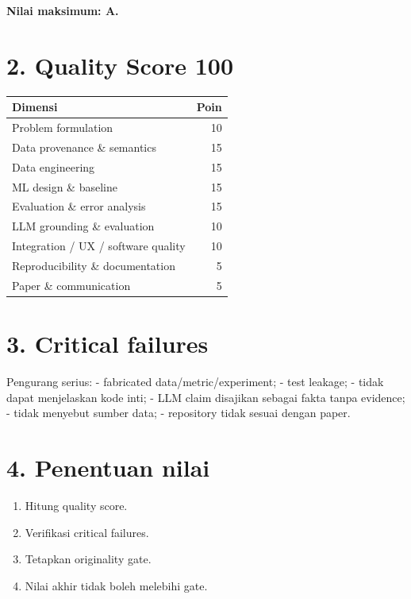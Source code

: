\documentclass[
  indonesian,
  letterpaper,
  DIV=11,
  numbers=noendperiod]{scrreprt}
\newcounter{none} %
\providecommand{\tightlist}{%
  \setlength{\itemsep}{0pt}\setlength{\parskip}{0pt}}
\begin{document}
\textbf{Nilai maksimum: A.}

\section{2. Quality Score 100}\label{quality-score-100}

{\def\LTcaptype{none} %
\begin{longtable}[]{@{}lr@{}}
\toprule\noalign{}
Dimensi & Poin \\
\midrule\noalign{}
\endhead
\bottomrule\noalign{}
\endlastfoot
Problem formulation & 10 \\
Data provenance \& semantics & 15 \\
Data engineering & 15 \\
ML design \& baseline & 15 \\
Evaluation \& error analysis & 15 \\
LLM grounding \& evaluation & 10 \\
Integration / UX / software quality & 10 \\
Reproducibility \& documentation & 5 \\
Paper \& communication & 5 \\
\end{longtable}
}

\section{3. Critical failures}\label{critical-failures}

Pengurang serius: - fabricated data/metric/experiment; - test leakage; -
tidak dapat menjelaskan kode inti; - LLM claim disajikan sebagai fakta
tanpa evidence; - tidak menyebut sumber data; - repository tidak sesuai
dengan paper.

\section{4. Penentuan nilai}\label{penentuan-nilai}

\begin{enumerate}
\def\labelenumi{\arabic{enumi}.}
\tightlist
\item
  Hitung quality score.
\item
  Verifikasi critical failures.
\item
  Tetapkan originality gate.
\item
  Nilai akhir tidak boleh melebihi gate.
\end{enumerate}
\end{document}

